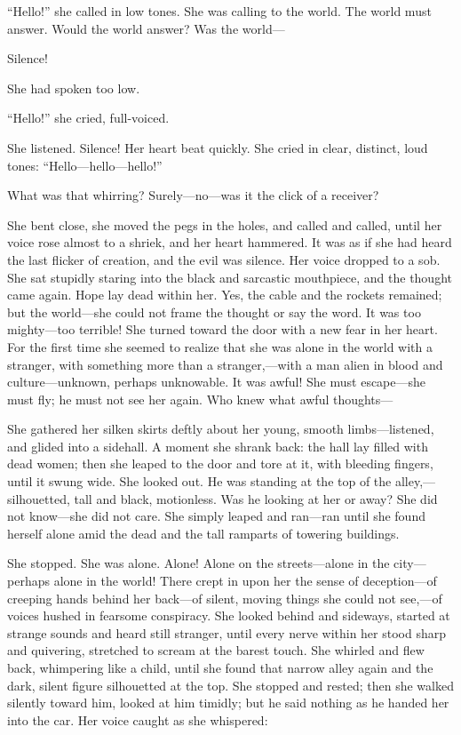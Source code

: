 ``Hello!'' she called in low tones. She was calling to the world.
The world must answer. Would the world answer? Was the world---

Silence!

She had spoken too low.

``Hello!'' she cried, full-voiced.

She listened. Silence! Her heart beat quickly. She cried in
clear, distinct, loud tones: ``Hello---hello---hello!''

What was that whirring? Surely---no---was it the click of a
receiver?

She bent close, she moved the pegs in the holes, and called and
called, until her voice rose almost to a shriek, and her heart
hammered. It was as if she had heard the last flicker of
creation, and the evil was silence. Her voice dropped to a sob.
She sat stupidly staring into the black and sarcastic
mouthpiece, and the thought came again. Hope lay dead within
her. Yes, the cable and the rockets remained; but the world---she
could not frame the thought or say the word. It was too
mighty---too terrible! She turned toward the door with a new fear
in her heart. For the first time she seemed to realize that she
was alone in the world with a stranger, with something more than
a stranger,---with a man alien in blood and culture---unknown,
perhaps unknowable. It was awful! She must escape---she must fly;
he must not see her again. Who knew what awful thoughts---

She gathered her silken skirts deftly about her young, smooth
limbs---listened, and glided into a sidehall. A moment she shrank
back: the hall lay filled with dead women; then she leaped to
the door and tore at it, with bleeding fingers, until it swung
wide. She looked out. He was standing at the top of the
alley,---silhouetted, tall and black, motionless. Was he looking
at her or away? She did not know---she did not care. She simply
leaped and ran---ran until she found herself alone amid the dead
and the tall ramparts of towering buildings.

She stopped. She was alone. Alone! Alone on the streets---alone in
the city---perhaps alone in the world! There crept in upon her the
sense of deception---of creeping hands behind her back---of silent,
moving things she could not see,---of voices hushed in fearsome
conspiracy. She looked behind and sideways, started at strange
sounds and heard still stranger, until every nerve within her
stood sharp and quivering, stretched to scream at the barest
touch. She whirled and flew back, whimpering like a child, until
she found that narrow alley again and the dark, silent figure
silhouetted at the top. She stopped and rested; then she walked
silently toward him, looked at him timidly; but he said nothing
as he handed her into the car. Her voice caught as she
whispered:

